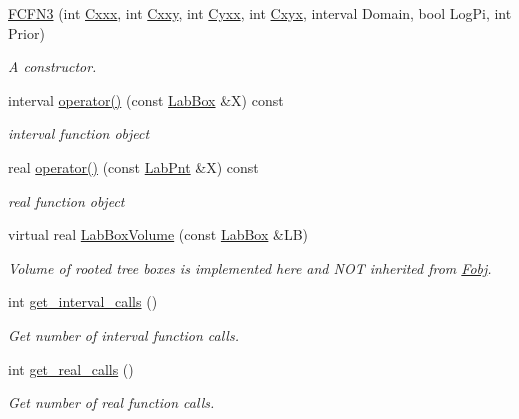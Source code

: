 \begin{DoxyCompactItemize}
\item 
\hyperlink{classFCFN3_ae05483641a5893ee95d3158343cf9259}{\-F\-C\-F\-N3} (int \hyperlink{classFCFN3_a70ede8e738b72b8bea0ba6eb5e44e884}{\-Cxxx}, int \hyperlink{classFCFN3_a1a5c9deec90452588e2f57f5291881b0}{\-Cxxy}, int \hyperlink{classFCFN3_a4e3aae643d4c68030d916df7ac71b538}{\-Cyxx}, int \hyperlink{classFCFN3_a60144493a83a2555c774cf7dfa4c9ec0}{\-Cxyx}, interval \-Domain, bool \-Log\-Pi, int \-Prior)
\begin{DoxyCompactList}\small\item\em \-A constructor. \end{DoxyCompactList}\item 
interval \hyperlink{classFCFN3_aec0a3534e5961954300b910f7a7401da}{operator()} (const \hyperlink{classLabBox}{\-Lab\-Box} \&\-X) const 
\begin{DoxyCompactList}\small\item\em interval function object \end{DoxyCompactList}\item 
real \hyperlink{classFCFN3_a922aacaa4b75d80ef6a08ae3243e63fc}{operator()} (const \hyperlink{classLabPnt}{\-Lab\-Pnt} \&\-X) const 
\begin{DoxyCompactList}\small\item\em real function object \end{DoxyCompactList}\item 
virtual real \hyperlink{classFCFN3_ae16fa2a68755b135ac0d4f9faea41b20}{\-Lab\-Box\-Volume} (const \hyperlink{classLabBox}{\-Lab\-Box} \&\-L\-B)
\begin{DoxyCompactList}\small\item\em \-Volume of rooted tree boxes is implemented here and \-N\-O\-T inherited from \hyperlink{classFobj}{\-Fobj}. \end{DoxyCompactList}\item 
int \hyperlink{classFCFN3_acfca28a02e2f9dbcf8ff115a8bb4f262}{get\-\_\-interval\-\_\-calls} ()
\begin{DoxyCompactList}\small\item\em \-Get number of interval function calls. \end{DoxyCompactList}\item 
int \hyperlink{classFCFN3_acc6f4fb7f07f280fe124499e9c5062ab}{get\-\_\-real\-\_\-calls} ()
\begin{DoxyCompactList}\small\item\em \-Get number of real function calls. \end{DoxyCompactList}\end{DoxyCompactItemize}
